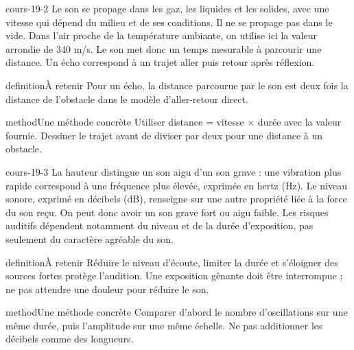 \documentclass[12pt,twoside,openany]{book}
\begin{document}
\label{ch-19-cours-2}
\begin{pcFiche}{cours-19-2}
Le son se propage dans les gaz, les liquides et les solides, avec une vitesse qui dépend du milieu et de ses conditions. Il ne se propage pas dans le vide. Dans l’air proche de la température ambiante, on utilise ici la valeur arrondie de 340 m/s. Le son met donc un temps mesurable à parcourir une distance. Un écho correspond à un trajet aller puis retour après réflexion.\par
{}
\begin{pcEncadre}{definition}{À retenir}
Pour un écho, la distance parcourue par le son est deux fois la distance de l’obstacle dans le modèle d’aller-retour direct.\par
\end{pcEncadre}
\begin{pcEncadre}{method}{Une méthode concrète}
Utiliser distance = vitesse \(\times\) durée avec la valeur fournie. Dessiner le trajet avant de diviser par deux pour une distance à un obstacle.\par
\end{pcEncadre}
\end{pcFiche}
\label{ch-19-cours-3}
\begin{pcFiche}{cours-19-3}
La hauteur distingue un son aigu d’un son grave : une vibration plus rapide correspond à une fréquence plus élevée, exprimée en hertz (Hz). Le niveau sonore, exprimé en décibels (dB), renseigne sur une autre propriété liée à la force du son reçu. On peut donc avoir un son grave fort ou aigu faible. Les risques auditifs dépendent notamment du niveau et de la durée d’exposition, pas seulement du caractère agréable du son.\par
{}
\begin{pcEncadre}{definition}{À retenir}
Réduire le niveau d’écoute, limiter la durée et s’éloigner des sources fortes protège l’audition. Une exposition gênante doit être interrompue ; ne pas attendre une douleur pour réduire le son.\par
\end{pcEncadre}
\begin{pcEncadre}{method}{Une méthode concrète}
Comparer d’abord le nombre d’oscillations sur une même durée, puis l’amplitude sur une même échelle. Ne pas additionner les décibels comme des longueurs.\par
\end{pcEncadre}
\end{pcFiche}
\end{document}
